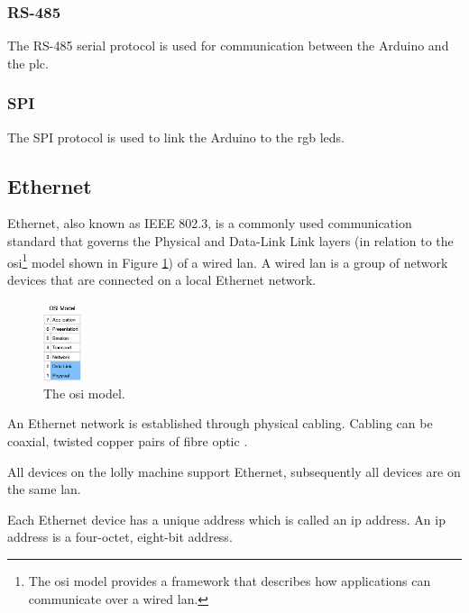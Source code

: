     \subsubsection{RS-485}
    The RS-485 serial protocol is used for communication between the Arduino and the \acrshort{plc}.
    
    \subsubsection{SPI}
    The SPI protocol is used to link the Arduino to the \acrshort{rgb} \acrshort{led}s.
    

 
     
\subsection{Ethernet}
    Ethernet, also known as IEEE 802.3, is a commonly used communication standard that governs the Physical and Data-Link Link layers (in relation to the \acrshort{osi}\footnote{The \acrshort{osi} model provides a framework that describes how applications can communicate over a wired \acrshort{lan}\cite{scott2021networking}.} model shown in Figure \ref{fig:osi}) of a wired \acrshort{lan}\cite{scott2021networking}. A wired \acrfull{lan} is a group of network devices that are connected on a local Ethernet network.  
    
        \begin{figure}[H]
            \centering
            \includegraphics[width = 0.1\textwidth]{2_images/osi.png}
            \caption{The \acrshort{osi} model\cite{scott2021networking}.}
            \label{fig:osi}
        \end{figure} 
    
    An Ethernet network is established through physical cabling. Cabling can be coaxial, twisted copper pairs of fibre optic \cite{scott2021networking}.
    
    All devices on the lolly machine support Ethernet, subsequently all devices are on the same \acrshort{lan}.
    
    Each Ethernet device has a unique address which is called an \acrshort{ip} address. An \acrshort{ip} address is a four-octet, eight-bit address\cite{scott2021networking}.  
    
